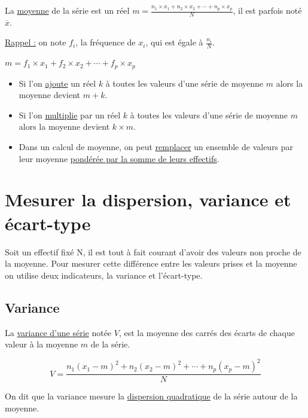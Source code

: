 \documentclass[french]{book}
\begin{document}
\begin{defn}
La \underline{moyenne} de la série est un réel $m=\frac{n_1\times x_1 + n_2 \times x_2 + \cdots + n_p \times x_p }{N}$, il est parfois noté $\overline{x}$.
\end{defn}

\underline{Rappel :} on note $f_i$, la fréquence de $x_i$, qui est égale à $\frac{n_i}{N}$.

\begin{prop}
$m=f_1 \times x_1 + f_2 \times x_2 + \cdots +f_p \times x_p$
\end{prop}


\begin{prop}
\begin{itemize}
\item[1)] Si l'on \underline{ajoute} un réel $k$ à toutes les valeurs d'une série de moyenne $m$ alors la moyenne devient $m+k$.
\item[2)] Si l'on \underline{multiplie} par un réel $k$ à toutes les valeurs d'une série de moyenne $m$ alors la moyenne devient $k \times m$.
\item[3)] Dans un calcul de moyenne, on peut \underline{remplacer} un ensemble de valeurs par leur moyenne \underline{pondérée par la somme de leurs effectifs}.

\end{itemize}
\end{prop}

\section{Mesurer la dispersion, variance et écart-type}
Soit un effectif fixé N, il est tout à fait courant d'avoir des valeurs non proche de la moyenne. Pour mesurer cette différence entre les valeurs prises et la moyenne on utilise deux indicateurs, la variance et l'écart-type.

\subsection{Variance}
\begin{defn}
La \underline{variance d'une série} notée $V$, est la moyenne des carrés des écarts de chaque valeur à la moyenne $m$ de la série.

$$V=\frac{n_1(x_1-m)^2+n_2(x_2-m)^2+\cdots+n_p(x_p-m)^2}{N}$$

On dit que la variance mesure la \underline{dispersion quadratique} de la série autour de la moyenne.
\end{defn}
 
\end{document}
